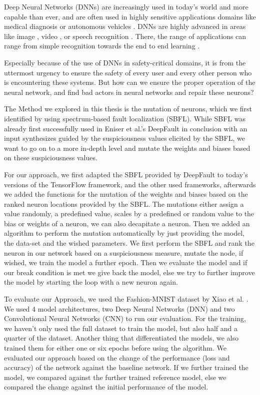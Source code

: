 Deep Neural Networks (DNNs) \cite{lecun_deep_2015} are increasingly used in today's world and more capable than ever, and are often used in highly sensitive applications domains like medical diagnosis \cite{litjens_survey_2017} or autonomous vehicles \cite{bojarski_end_2016}.
DNNs are highly advanced in areas like image \cite{krizhevsky_imagenet_2012, ciresan_multi-column_2012}, video \cite{jiang_exploiting_2018}, or speech recognition \cite{hinton_deep_2012}.
There, the range of applications can range from simple recognition towards the end to end learning \cite{bojarski_end_2016}.

Especially because of the use of DNNs in safety-critical domains, it is from the uttermost urgency to ensure the safety of every user and every other person who is encountering these systems.
But how can we ensure the proper operation of the neural network, and find bad actors in neural networks and repair these neurons?

The Method we explored in this thesis is the mutation of neurons, which we first identified by using spectrum-based fault localization (SBFL).
While SBFL was already first successfully used in Eniser et al.'s DeepFault \cite{eniser_deepfault_2019} in conclusion with an input synthesizes guided by the suspiciousness values elicited by the SBFL, we want to go on to a more in-depth level and mutate the weights and biases based on these suspiciousness values.

For our approach, we first adapted the SBFL provided by DeepFault to today's versions of the TensorFlow framework, and the other used frameworks, afterwards we added the functions for the mutation of the weights and biases based on the ranked neuron locations provided by the SBFL\@.
The mutations either assign a value randomly, a predefined value, scales by a predefined or random value to the bias or weights of a neuron, we can also decapitate a neuron.
Then we added an algorithm to perform the mutation automatically by just providing the model, the data-set and the wished parameters.
We first perform the SBFL and rank the neuron in our network based on a suspiciousness measure, mutate the node, if wished, we train the model a further epoch.
Then we evaluate the model and if our break condition is met we give back the model, else we try to further improve the model by starting the loop with a new neuron again.

To evaluate our Approach, we used the Fashion-MNIST dataset by Xiao et al. \cite{xiao_fashion-mnist_2017}.
We used 4 model architectures, two Deep Neural Networks (DNN) and two Convolutional Neural Networks (CNN) to run our evaluation.
For the training, we haven't only used the full dataset to train the model, but also half and a quarter of the dataset.
Another thing that differentiated the models, we also trained them for either one or six epochs before using the algorithm.
We evaluated our approach based on the change of the performance (loss and accuracy) of the network against the baseline network.
If we further trained the model, we compared against the further trained reference model, else we compared the change against the initial performance of the model.

